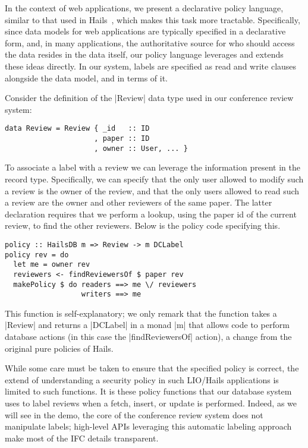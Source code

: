 In the context of web applications, we present a declarative policy
language, similar to that used in Hails~\cite{hails}, which makes this
task more tractable.
%
Specifically, since data models for web applications are typically
specified in a declarative form, and, in many applications, the
authoritative source for who should access the data resides in the
data itself, our policy language leverages and extends these ideas
directly. 
%
In our system, labels are specified as read and write clauses
alongside the data model, and in terms of it.

Consider the definition of the \hs|Review| data type used in our
conference review system:
\vspace*{-1.0em}
\begin{verbatim}
data Review = Review { _id   :: ID
                     , paper :: ID
                     , owner :: User, ... }
\end{verbatim}
\vspace*{-0.4em}
To associate a label with a review we can leverage the 
information present in the record type.
%
Specifically, we can specify that the only user allowed to modify such
a review is the owner of the review, and that the only users allowed
to read such a review are the owner and other reviewers of the same
paper.
%
The latter declaration requires that we perform a lookup, using the
paper id of the current review, to find the other reviewers.
%
Below is the policy code specifying this.
%
\vspace*{-1.0em}
\begin{verbatim}
policy :: HailsDB m => Review -> m DCLabel
policy rev = do
  let me = owner rev
  reviewers <- findReviewersOf $ paper rev
  makePolicy $ do readers ==> me \/ reviewers
                  writers ==> me
\end{verbatim}
\vspace*{-0.4em}
%
This function is self-explanatory; we only remark that the function
takes a \hs|Review| and returns a \hs|DCLabel| in a monad \hs|m| that
allows code to perform database actions (in this case the
\hs|findReviewersOf| action), a change from the original pure policies
of Hails.
%

While some care must be taken to ensure that the specified policy is
correct, the extend of understanding a security policy in such
LIO/Hails applications is limited to such functions.
%
It is these policy functions that our database system uses to label
reviews when a fetch, insert, or update is performed.
%
Indeed, as we will see in the demo, the core of the conference review
system does not manipulate labels; high-level APIs leveraging this
automatic labeling approach make most of the IFC details transparent.


